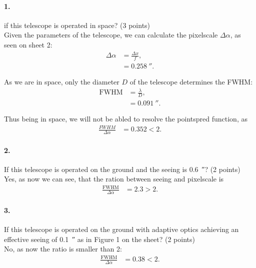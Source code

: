 \documentclass[11pt,a4paper,twoside]{article}
\begin{document}
\paragraph{1.} if this telescope is operated in space? (3 points) \\

Given the parameters of the telescope, we can calculate the pixelscale $\Delta
\alpha$, as seen on sheet 2:
\begin{align}
\Delta \alpha   &= \frac{\Delta x}{f}, \\
                &= \SI{0.258}{\arcsecond}.
\end{align}

As we are in space, only the diameter $D$ of the telescope determines the 
FWHM:
\begin{align}
\mathrm{FWHM}   &= \frac{\lambda}{D},    \\
                &= \SI{0.091}{\arcsecond}.
\end{align}

Thus being in space, we will not be abled to resolve the pointspred function,
as
\begin{align}
\frac{FWHM}{\Delta \alpha} &= 0.352 < 2.
\end{align}

\paragraph{2.} If this telescope is operated on the ground and the seeing is
\SI{0.6}{\arcsecond}? (2 points) \\

Yes, as now we can see, that the ration between seeing and pixelscale is
\begin{align}
\frac{\mathrm{FWHM}}{\Delta\alpha} &= 2.3 > 2.
\end{align}

\paragraph{3.} If this telescope is operated on the ground with adaptive optics
achieving an effective seeing of \SI{0.1}{\arcsecond} as in Figure 1 on the
sheet? (2 points) \\

No, as now the ratio is smaller than 2:
\begin{align}
\frac{\mathrm{FWHM}}{\Delta\alpha} &= 0.38 < 2.
\end{align}
\end{document}
